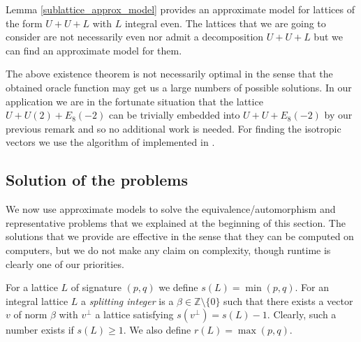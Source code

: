 \documentclass[a4paper,11pt]{article}
\newcommand{\ZZ}{\mathbb Z}
\begin{document}
Lemma \ref{sublattice_approx_model} provides an approximate model for lattices of the form $U + U + L$
with $L$ integral even. The lattices that we are going to consider are not necessarily even nor admit
a decomposition $U+U+L$ but we can find an approximate model for them.

The above existence theorem is not necessarily optimal in the sense that the obtained oracle function
may get us a large numbers of possible solutions.
In our application we are in the fortunate situation that the lattice $U + U(2) + E_8(-2)$
can be trivially embedded into $U + U + E_8(-2)$ by our previous remark and so no additional work is needed.
For finding the isotropic vectors we use the algorithm of \cite{simon} implemented in \cite{pari}.

\subsection{Solution of the problems}\label{subsection_solutionsproblems}

We now use approximate models to solve the equivalence/automorphism and
representative problems that we explained at the beginning of this section.
The solutions that we provide are effective in the sense that they can be
computed on computers, but we do not make any claim on complexity, though
runtime is clearly one of our priorities.

For a lattice $L$ of signature $(p,q)$ we define $s(L) = \min(p,q)$.
For an integral lattice $L$ a {\em splitting integer} is a $\beta\in \ZZ \setminus \{0\}$
such that there exists
a vector $v$ of norm $\beta$ with $v^{\perp}$ a lattice satisfying $s(v^{\perp}) = s(L) - 1$.
Clearly, such a number exists if $s(L) \geq 1$.
We also define $r(L) = \max(p,q)$.
\end{document}
